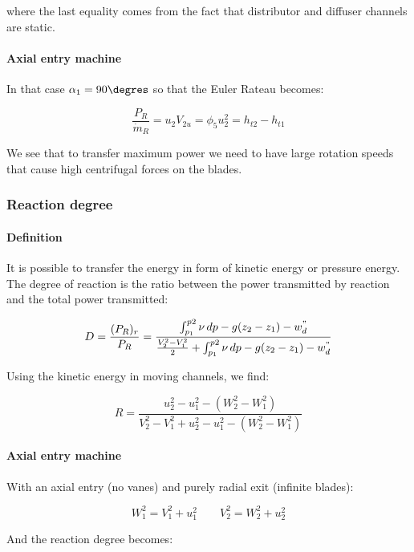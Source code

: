 where the last equality comes from the fact that distributor and diffuser channels are static. 

\paragraph{Axial entry machine}
In that case $\alpha _1 = 90\degres$ so that the Euler Rateau becomes: 

\begin{equation}
\frac{P_R}{\dot{m}_R} = u_2V_{2u} = \phi _5 u_2^2 = h_{t2} - h_{t1}
\end{equation}

We see that to transfer maximum power we need to have large rotation speeds that cause high centrifugal forces on the blades. 

\subsubsection{Reaction degree}
\paragraph{Definition}
It is possible to transfer the energy in form of kinetic energy or pressure energy. The degree of reaction is the ratio between the power transmitted by reaction and the total power transmitted: 

\begin{equation}
D = \frac{(P_R)_r}{P_R} = \frac{\int _{p_1}^{p2} \nu \, dp - g(z_2-z_1) - w^"_d}{\frac{V_2^2-V_1^2}{2} + \int _{p_1}^{p2} \nu \, dp - g(z_2-z_1)  - w^"_d}
\end{equation}

Using the kinetic energy in moving channels, we find: 

\begin{equation}
R = \frac{u_2^2 - u_1^2 - (W_2^2-W_1^2)}{V_2^2-V_1^2 + u_2^2 - u_1^2 - (W_2^2-W_1^2)}
\end{equation}

\paragraph{Axial entry machine}
With an axial entry (no vanes) and purely radial exit (infinite blades):

\begin{equation}
W_1^2 = V_1^2+ u_1^2 \qquad V_2^2 = W_2^2+ u_2^2
\end{equation}

And the reaction degree becomes: 


